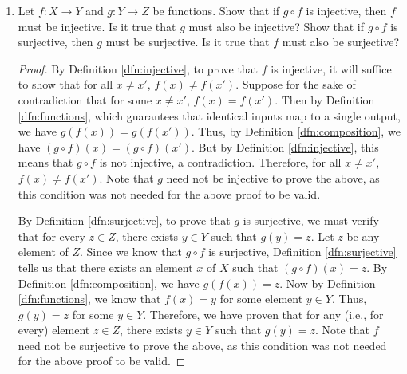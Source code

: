 \documentclass[../main.tex]{subfiles}
\begin{document}
\begin{enumerate}[ref={\thesection.\arabic*}]
\begin{proof}
        Suppose for the sake of contradiction that $g\neq\tilde{g}$. Then by Definition \ref{dfn:functionEquality}, either $g$ and $\tilde{g}$ have a different domain or range, or $g(y)\neq\tilde{g}(y)$ for some $y\in Y$. Since $g$ and $\tilde{g}$ have the same domain and range, we must have $g(y)\neq\tilde{g}(y)$ for some $y\in Y$. Now since $f$ is surjective, by Definition \ref{dfn:surjective}, for every $y\in Y$, there is some $x\in X$ such that $y=f(x)$. Thus, $g(f(x))\neq\tilde{g}(f(x))$ for some $x\in X$. Consequently, by Definition \ref{dfn:composition}, $(g\circ f)(x)\neq(\tilde{g}\circ f)(x)$ for some $x\in X$. But this contradicts Definition \ref{dfn:functionEquality}, which, since $g\circ f=\tilde{g}\circ f$, implies that $(g\circ f)(x)=(\tilde{g}\circ f)(x)$ for all $x\in X$. Note that $g$ is not necessarily equal to $\tilde{g}$ if we drop the condition that $f$ is surjective (if $f$ is not surjective, then, as we've only proven the assertion for all $y=f(x)$, we could have some $y\in Y$ not associated with an $f(x)$ for which $g(y)\neq\tilde{g}(y)$).
    \end{proof}
    \item \label{exr:3.3.5}Let $f:X\to Y$ and $g:Y\to Z$ be functions. Show that if $g\circ f$ is injective, then $f$ must be injective. Is it true that $g$ must also be injective? Show that if $g\circ f$ is surjective, then $g$ must be surjective. Is it true that $f$ must also be surjective?
    \begin{proof}
        By Definition \ref{dfn:injective}, to prove that $f$ is injective, it will suffice to show that for all $x\neq x'$, $f(x)\neq f(x')$. Suppose for the sake of contradiction that for some $x\neq x'$, $f(x)=f(x')$. Then by Definition \ref{dfn:functions}, which guarantees that identical inputs map to a single output, we have $g(f(x))=g(f(x'))$. Thus, by Definition \ref{dfn:composition}, we have $(g\circ f)(x)=(g\circ f)(x')$. But by Definition \ref{dfn:injective}, this means that $g\circ f$ is not injective, a contradiction. Therefore, for all $x\neq x'$, $f(x)\neq f(x')$. Note that $g$ need not be injective to prove the above, as this condition was not needed for the above proof to be valid.\par
        By Definition \ref{dfn:surjective}, to prove that $g$ is surjective, we must verify that for every $z\in Z$, there exists $y\in Y$ such that $g(y)=z$. Let $z$ be any element of $Z$. Since we know that $g\circ f$ is surjective, Definition \ref{dfn:surjective} tells us that there exists an element $x$ of $X$ such that $(g\circ f)(x)=z$. By Definition \ref{dfn:composition}, we have $g(f(x))=z$. Now by Definition \ref{dfn:functions}, we know that $f(x)=y$ for some element $y\in Y$. Thus, $g(y)=z$ for some $y\in Y$. Therefore, we have proven that for any (i.e., for every) element $z\in Z$, there exists $y\in Y$ such that $g(y)=z$. Note that $f$ need not be surjective to prove the above, as this condition was not needed for the above proof to be valid.

\end{proof}
\end{enumerate}
\end{document}
